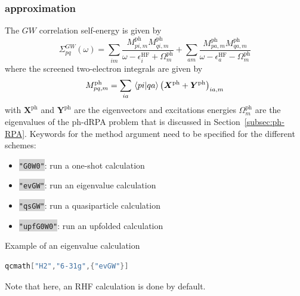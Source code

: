 \documentclass[aip,jcp,reprint,noshowkeys,superscriptaddress]{revtex4-1}
\newcommand{\GW}{\text{$GW$}}
\newcommand{\HF}{\text{HF}}
\newcommand{\ph}{\text{ph}}
\newcommand{\ep}{\epsilon}
\newcommand{\bX}{\bm{X}}
\newcommand{\bY}{\bm{Y}}
\newcommand{\Sigm}{\Sigma}
\newcommand{\sERI}[2]{M_{#1}^{#2}}
\newcommand{\Ome}{\Omega}
\newcommand{\keyword}[1]{{\colorbox{lightgray}{\texttt{#1}}}}
\begin{document}
\subsubsection*{{\GW} approximation}
The $\GW$ correlation self-energy is given by
\begin{equation}
	\Sigm_{pq}^{\GW}(\omega) 
	= \sum_{im} \frac{\sERI{pi,m}{\ph}\sERI{qi,m}{\ph}}{\omega - \ep_{i}^{\HF} + \Ome_{m}^{\ph}}
	+ \sum_{am} \frac{\sERI{pa,m}{\ph}\sERI{qa,m}{\ph}}{\omega - \ep_{a}^{\HF} - \Ome_{m}^{\ph}}
\end{equation}
where the screened two-electron integrals are given by 
\begin{equation}
	\sERI{pq,m}{\ph} = \sum_{ia} \braket*{pi}{qa} \qty(\bX^{\ph} + \bY^{\ph} )_{ia,m}
\end{equation}
with $\bX^{\ph}$ and $\bY^{\ph}$ are the eigenvectors and excitations energies $\Ome_{m}^{\ph}$ are the eigenvalues of the ph-dRPA problem that is discussed in Section~\ref{subsec:ph-RPA}.
Keywords for the method argument need to be specified for the different schemes: 
\begin{itemize}
\item \keyword{"G0W0"}: run a one-shot calculation
\item \keyword{"evGW"}: run an eigenvalue calculation 
\item \keyword{"qsGW"}: run a quasiparticle calculation 
\item \keyword{"upfG0W0"}: run an upfolded calculation
\end{itemize}

Example of an eigenvalue calculation
\begin{lstlisting}[extendedchars=true,language=Mathematica]
	qcmath["H2","6-31g",{"evGW"}]
\end{lstlisting}
Note that here, an RHF calculation is done by default.

\end{document}
